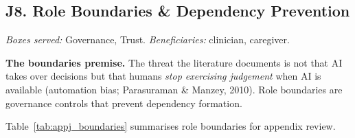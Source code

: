 \subsection*{J8. Role Boundaries \& Dependency Prevention}
\label{sec:appj_boundaries}

\noindent\emph{Boxes served:} Governance, Trust. \emph{Beneficiaries:} clinician, caregiver.

\noindent\textbf{The boundaries premise.} The threat the literature documents is not that AI takes over decisions but that humans \emph{stop exercising judgement} when AI is available (automation bias; Parasuraman \& Manzey, 2010). Role boundaries are governance controls that prevent dependency formation.

\noindent Table~\ref{tab:appj_boundaries} summarises role boundaries for appendix review.

